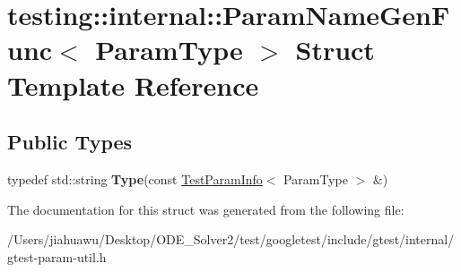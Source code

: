 \hypertarget{structtesting_1_1internal_1_1_param_name_gen_func}{}\section{testing\+:\+:internal\+:\+:Param\+Name\+Gen\+Func$<$ Param\+Type $>$ Struct Template Reference}
\label{structtesting_1_1internal_1_1_param_name_gen_func}
\subsection*{Public Types}
\begin{DoxyCompactItemize}
\item 
\mbox{\label{structtesting_1_1internal_1_1_param_name_gen_func_adf1ce5df22a930ae715082862d72590f}} 
typedef std\+::string {\bfseries Type}(const \mbox{\hyperlink{structtesting_1_1_test_param_info}{Test\+Param\+Info}}$<$ Param\+Type $>$ \&)
\end{DoxyCompactItemize}


The documentation for this struct was generated from the following file\+:\begin{DoxyCompactItemize}
\item 
/\+Users/jiahuawu/\+Desktop/\+O\+D\+E\+\_\+\+Solver2/test/googletest/include/gtest/internal/gtest-\/param-\/util.\+h\end{DoxyCompactItemize}
